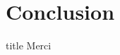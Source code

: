 \documentclass{beamer}
\newcommand{\lab}{\texttt{lab}}
\begin{document}
\section{Conclusion}

\begin{frame}
	\begin{beamercolorbox}[sep=8pt,center,shadow=true,rounded=true]{title}
		Merci\par
	\end{beamercolorbox}
\end{frame}
\end{document}

